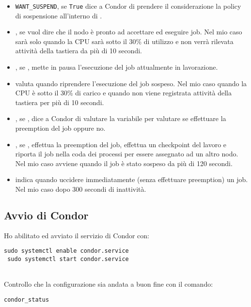 \begin{itemize}
	\item \lstinline[style=cmd]|WANT_SUSPEND|, se \lstinline[style=cmd]|True| dice a Condor di prendere il considerazione la policy di sospensione all'interno di .
	\item {}, se  vuol dire che il nodo \`{e} pronto ad accettare ed eseguire job. Nel mio caso sar\`{a}  solo quando la CPU sar\`{a} sotto il 30\% di utilizzo e non verr\`{a} rilevata attivit\`{a} della tastiera da pi\`{u} di 10 secondi.
	\item {}, se , mette in pausa l'esecuzione del job attualmente in lavorazione.
	\item {} valuta quando riprendere l'esecuzione del job sospeso. Nel mio caso quando la CPU \`{e} sotto il 30\% di carico e quando non viene registrata attivit\`{a} della tastiera per pi\`{u} di 10 secondi.
	\item {}, se , dice a Condor di valutare la variabile  per valutare se effettuare la preemption del job oppure no.
	\item {}, se , effettua la preemption del job, effettua un checkpoint del lavoro e riporta il job nella coda dei processi per essere assegnato ad un altro nodo. Nel mio caso avviene quando il job \`{e} stato sospeso da pi\`{u} di 120 secondi.
	\item {} indica quando uccidere immediatamente (senza effettuare preemption) un job. Nel mio caso dopo 300 secondi di inattivit\`{a}.
\end{itemize}

\subsection{Avvio di Condor}

Ho abilitato ed avviato il servizio di Condor con:

\begin{lstlisting}[style=cmd]
 sudo systemctl enable condor.service
 sudo systemctl start condor.service
\end{lstlisting}
\ \\
Controllo che la configurazione sia andata a buon fine con il comando:

\begin{lstlisting}[style=cmd]
 condor_status
\end{lstlisting}

